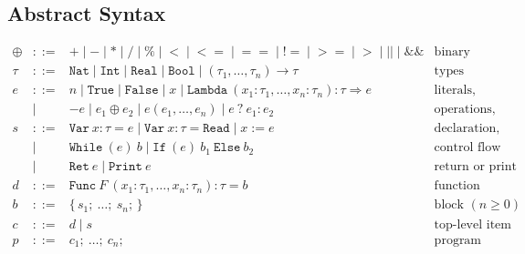 \documentclass[11pt,a4paper]{article}
\newcommand{\kw}[1]{\mathtt{#1}}                %
\begin{document}
\subsection{Abstract Syntax}
%
\[
\begin{array}{rcll}
	  \oplus & ::=  & \kw{+} \mid \kw{-} \mid \kw{*} \mid \kw{/} \mid \kw{\%}
					   \mid \kw{<} \mid \kw{<=} \mid \kw{==} \mid \kw{!=} \mid \kw{>=} \mid \kw{>} 
					   \mid \kw{||} \mid \kw{\&\&}                                                                                     & \text{binary operators}                 \\
	\tau   & ::=  & \kw{Nat} \mid \kw{Int} \mid \kw{Real} \mid \kw{Bool} \mid  (\tau_1, \dots, \tau_n) \to \tau                        & \text{types}                            \\
	e      & ::=  & n \mid \kw{True} \mid \kw{False} \mid x 
	                  \mid \kw{Lambda}\ (x_1 : \tau_1, \dots, x_n : \tau_n) : \tau \Rightarrow e                                       & \text{literals, variable, lambda}       \\
	& \mid & -e \mid e_1 \oplus e_2 \mid e(e_1, \dots, e_n) \mid e\ ?\ e_1 : e_2                                                       & \text{operations, application, ternary} \\
	s      & ::=  & \kw{Var}\ x : \tau = e \mid \kw{Var}\ x : \tau = \kw{Read} \mid  x := e                                            & \text{declaration, read, assign}        \\
	& \mid & \kw{While}\ (e)\ b \mid \kw{If}\ (e)\ b_1\ \kw{Else}\ b_2                                                                 & \text{control flow}                     \\
	& \mid & \kw{Ret}\ e \mid \kw{Print}\ e                                                                                            & \text{return or print}                  \\
	d & ::= & \kw{Func}\ F\ (x_1 : \tau_1, \dots, x_n : \tau_n) : \tau = b                                                             & \text{function declaration}             \\
	b      & ::=  & \{\, s_1;\ \dots;\ s_n; \,\}                                                                                       & \text{block } (n \ge 0)                 \\
	c      & ::=  & d \mid s                                                                                                           & \text{top-level item}                   \\
	p      & ::=  & c_1;\ \dots;\ c_n;                                                                                                 & \text{program}
\end{array}
\]
\end{document}
